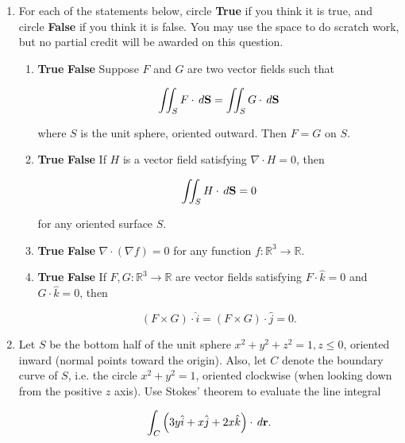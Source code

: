 \documentclass[12 pt]{report}
\begin{document}
\begin{enumerate}
\newpage

\item For each of the statements below, circle \textbf{True} if you think it is true, and circle \textbf{False} if you think it is false. You may use the space to do scratch work, but no partial credit will be awarded on this question. 

\begin{enumerate} 
\item \textbf{True} \hspace{5pt} \textbf{False} \hspace{10pt} Suppose $F$ and $G$ are two vector fields such that 

$$\iint_S F \cdot \, d\bold{S} = \iint_S G \cdot \, d\bold{S}$$

where $S$ is the unit sphere, oriented outward. Then $F = G$ on $S$. 

\vfill

\item \textbf{True} \hspace{5pt} \textbf{False} \hspace{10pt} If $H$ is a vector field satisfying $\nabla \cdot H = 0$, then 

$$\iint_S H \cdot \, d\bold{S} = 0$$

for any oriented surface $S$. 

\vfill

\item \textbf{True} \hspace{5pt} \textbf{False} \hspace{10pt} $\nabla \cdot( \nabla f) = 0$ for any function $f: \mathbb{R}^3 \to \mathbb{R}$. 

\vfill

\item \textbf{True} \hspace{5pt} \textbf{False} \hspace{10pt} If $F, G: \mathbb{R}^3 \to \mathbb{R}$ are vector fields satisfying $F \cdot \hat{k} = 0$ and $G \cdot \hat{k} = 0$, then 

$$(F \times G) \cdot \hat{i} = (F \times G) \cdot \hat{j} =  0.$$  

\vfill

\end{enumerate}

\newpage

\item Let $S$ be the bottom half of the unit sphere $x^2 + y^2 + z^2 = 1, z \leq 0$, oriented inward (normal points toward the origin). Also, let $C$ denote the boundary curve of $S$, i.e. the circle $x^2 + y^2 = 1$, oriented clockwise (when looking down from the positive $z$ axis). Use Stokes' theorem to evaluate the line integral

$$\int_C \left( 3y \hat{i} + x \hat{j} + 2x \hat{k} \right) \cdot  \, d\bold{r}.$$

\end{enumerate}
\end{document}
